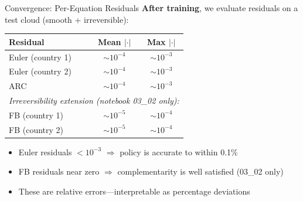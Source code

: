 \documentclass[aspectratio=169,11pt]{beamer}
\newcommand{\emphc}[1]{\textcolor{harvardcrimson}{#1}}
\begin{document}
\begin{frame}{Convergence: Per-Equation Residuals}
\textbf{After training}, we evaluate residuals on a test cloud (smooth + irreversible):

\vspace{0.5em}
\begin{center}
\begin{tabular}{lcc}
\toprule
\textbf{Residual} & \textbf{Mean $|\cdot|$} & \textbf{Max $|\cdot|$} \\
\midrule
Euler (country 1) & $\sim 10^{-4}$ & $\sim 10^{-3}$ \\
Euler (country 2) & $\sim 10^{-4}$ & $\sim 10^{-3}$ \\
ARC & $\sim 10^{-4}$ & $\sim 10^{-3}$ \\
\midrule
\multicolumn{3}{l}{\textit{Irreversibility extension (notebook 03\_02 only):}} \\
FB (country 1) & $\sim 10^{-5}$ & $\sim 10^{-4}$ \\
FB (country 2) & $\sim 10^{-5}$ & $\sim 10^{-4}$ \\
\bottomrule
\end{tabular}
\end{center}

\vspace{0.3em}
\begin{itemize}
    \item Euler residuals $< 10^{-3}$ $\Rightarrow$ policy is accurate to within 0.1\%
    \item FB residuals near zero $\Rightarrow$ complementarity is well satisfied (03\_02 only)
    \item These are \emphc{relative errors}---interpretable as percentage deviations
\end{itemize}
\end{frame}
\end{document}
